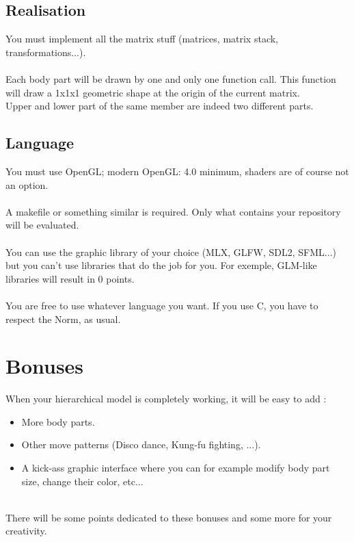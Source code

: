 \documentclass{42-en}
\begin{document}
		\subsection{Realisation}
            You must implement all the matrix stuff (matrices, matrix stack, transformations...).\\
            \\
			Each body part will be drawn by one and only one function call. This function will draw a 1x1x1 geometric shape at the origin of the current matrix.
		\\
		\info
		{
			Upper and lower part of the same member are indeed two different parts.
		}
		\
		\subsection{Language}
            You must use OpenGL; modern OpenGL: 4.0 minimum, shaders are of course not an option.\\
            \\
			A makefile or something similar is required. Only what contains your repository will be evaluated.\\
			\\
			You can use the graphic library of your choice (MLX, GLFW, SDL2, SFML...) but you can't use libraries that do the job for you. For exemple, GLM-like libraries will result in 0 points.\\
			\\
			You are free to use whatever language you want. If you use C, you have to respect the Norm, as usual.\\

		\newpage
			\section{Bonuses}

			When your hierarchical model is completely working, it will be easy to add :
			\begin{itemize}
				\item More body parts.
				\item Other move patterns (Disco dance, Kung-fu fighting, ...).
				\item A kick-ass graphic interface where you can for example modify body part size, change their color, etc...
			\end{itemize}
			\
			\\
			There will be some points dedicated to these bonuses and some more for your creativity.
\end{document}
